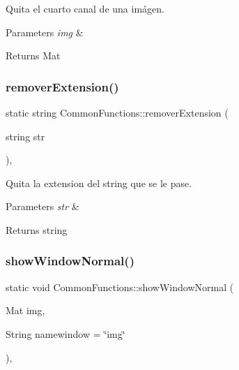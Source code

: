 Quita el cuarto canal de una imágen. 


\begin{DoxyParams}{Parameters}
{\em img} & \\
\hline
\end{DoxyParams}
\begin{DoxyReturn}{Returns}
Mat 
\end{DoxyReturn}
\mbox{\label{classCommonFunctions_a5393a67a9e631a763fe5874174e386d0}} 
\subsubsection{\texorpdfstring{remover\+Extension()}{removerExtension()}}
{\footnotesize\ttfamily static string Common\+Functions\+::remover\+Extension (\begin{DoxyParamCaption}\item[{string}]{str }\end{DoxyParamCaption})\hspace{0.3cm}{\ttfamily [inline]}, {\ttfamily [static]}}



Quita la extension del string que se le pase. 


\begin{DoxyParams}{Parameters}
{\em str} & \\
\hline
\end{DoxyParams}
\begin{DoxyReturn}{Returns}
string 
\end{DoxyReturn}
\mbox{\label{classCommonFunctions_a71529e35a71bbc74d49051d90a850c30}} 
\subsubsection{\texorpdfstring{show\+Window\+Normal()}{showWindowNormal()}}
{\footnotesize\ttfamily static void Common\+Functions\+::show\+Window\+Normal (\begin{DoxyParamCaption}\item[{Mat}]{img,  }\item[{String}]{namewindow = {\ttfamily \char`\"{}img\char`\"{}} }\end{DoxyParamCaption})\hspace{0.3cm}{\ttfamily [inline]}, {\ttfamily [static]}}



